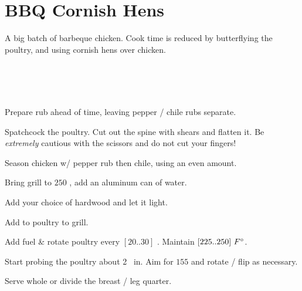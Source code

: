 \section[Cornish Hens]{BBQ Cornish Hens}


\begin{recipestats}[
	servings=$\approx$~24,
	preptime=1~\hour,
	bakingtime=$\approx$3~\hour,
	source=Kevin \& Mike,
]
\end{recipestats}

\begin{recipeabstract}
	A big batch of barbeque chicken.
	Cook time is reduced by butterflying the poultry, and using cornish hens over chicken.
\end{recipeabstract}


\begin{ingredientcolumns}[1]
	\begin{ingredientblock}
		\\
		\\
		\\
	\end{ingredientblock}
\end{ingredientcolumns}


\begin{preparation}
\item Prepare rub ahead of time, leaving pepper / chile rubs separate.
\item Spatchcock the poultry.
	Cut out the spine with shears and flatten it.
	Be \textit{extremely} cautious with the scissors and do not cut your fingers!
\item Season chicken w/ pepper rub then chile, using an even amount.
\item Bring grill to $250$ \Fahrenheit, add an aluminum can of water.
\item Add your choice of hardwood and let it light.
\item Add to poultry to grill.
\item Add fuel \& rotate poultry every $[20 .. 30]$ \minute.
	Maintain $[225 .. 250]~F^\circ$.
\item Start probing the poultry about 2 \hour~in.
	Aim for $155$ \Fahrenheit and rotate / flip as necessary.
\item Serve whole or divide the breast / leg quarter.
\end{preparation}


\recipeend%
